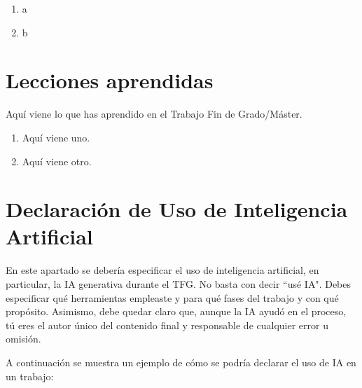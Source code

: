 \documentclass[a4paper, 12pt]{book}
\begin{document}
\begin{enumerate}
  \item a
  \item b
\end{enumerate}


\section{Lecciones aprendidas}
\label{sec:lecciones_aprendidas}

Aquí viene lo que has aprendido en el Trabajo Fin de Grado/Máster.

\begin{enumerate}
  \item Aquí viene uno.
  \item Aquí viene otro.
\end{enumerate}

\section{Declaración de Uso de Inteligencia Artificial}
\label{sec:uso_ia}

En este apartado se debería especificar el uso de inteligencia artificial, en particular, la IA generativa durante el TFG. No basta con decir ``usé IA". Debes especificar qué herramientas empleaste y para qué fases del trabajo y con qué propósito. Asimismo, debe quedar claro que, aunque la IA ayudó en el proceso, tú eres el autor único del contenido final y responsable de cualquier error u omisión.

A continuación se muestra un ejemplo de cómo se podría declarar el uso de IA en un trabajo:
\end{document}
